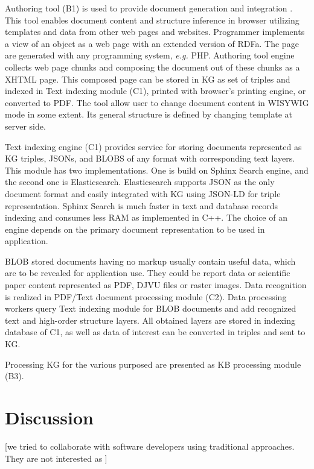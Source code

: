 \documentclass[
]{ceurart}
\begin{document}
Authoring tool (B1) is used to provide document generation and integration \cite{sibiricon}.  This tool enables document content and structure inference in browser utilizing templates and data from other web pages and websites.  Programmer implements a view of an object as a web page with an extended version of RDFa.  The page are generated with any programming system, \emph{e.g.} PHP.  Authoring tool engine collects web page chunks and composing the document out of these chunks as a XHTML page.  This composed page can be stored in KG as set of triples and indexed in Text indexing module (C1), printed with browser's printing engine, or converted to PDF.  The tool allow user to change document content in WISYWIG mode in some extent.  Its general structure is defined by changing template at server side.

Text indexing engine (C1) provides service for storing documents represented as KG triples, JSONs, and BLOBS of any format with corresponding text layers.  This module has two implementations.  One is build on Sphinx Search engine, and the second one is Elasticsearch.  Elasticsearch supports JSON as the only document format and easily integrated with KG using JSON-LD for triple representation.  Sphinx Search is much faster in text and database records indexing and consumes less RAM as implemented in C++.  The choice of an engine depends on the primary document representation to be used in application.

BLOB stored documents having no markup usually contain useful data, which are to be revealed for application use.  They could be report data or scientific paper content represented as PDF, DJVU files or raster images. Data recognition is realized in PDF/Text document processing module (C2).  Data processing workers query Text indexing module for BLOB documents and add recognized text and high-order structure layers.  All obtained layers are stored in indexing database of C1, as well as data of interest can be converted in triples and sent to KG.

Processing KG for the various purposed are presented as KB processing module (B3).


\section{Discussion}
\label{sec:disc}


[we tried to collaborate with software developers using traditional approaches.  They are not interested as ]
\end{document}
